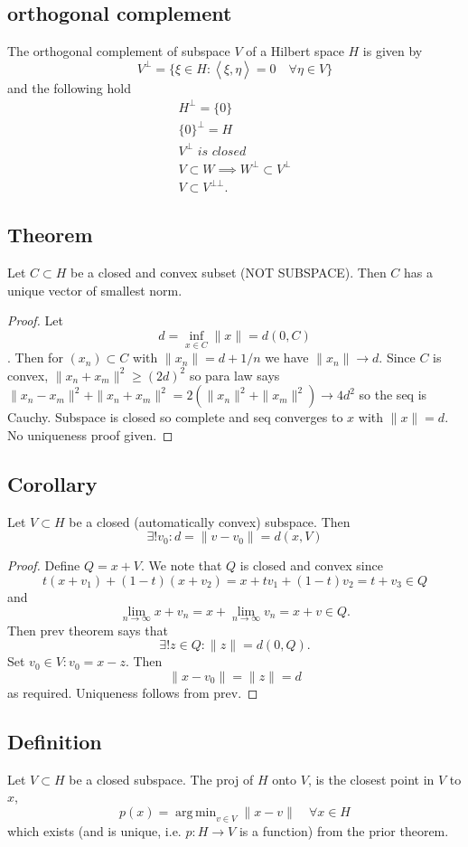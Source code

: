 \documentclass{article}
\DeclareMathOperator*{\argmin}{arg\,min}
\DeclareMathOperator\la{\langle}
\DeclareMathOperator\ra{\rangle}
\begin{document}
\subsection*{orthogonal complement}
The orthogonal complement of subspace $V$ of a Hilbert space $H$ is given by $$
V^{\bot} = \{ \xi \in H: \la \xi, \eta \ra = 0 \quad \forall \eta \in V \}
$$
and the following hold \begin{gather*}
H^{\bot} = \{ 0 \} \\
\{0\}^{\bot} = H \\
V^{\bot} \,\, is \,\, closed \\
V \subset W \implies W^{\bot} \subset V^{\bot} \\
V \subset V^{\bot \bot}.
\end{gather*}
\subsection*{Theorem}
Let $C \subset H$ be a closed and convex subset (NOT SUBSPACE). Then $C$ has a unique vector of smallest norm. \begin{proof}
Let $$d = \inf_{x \in C} \|x\| = d(0,C) $$. Then for $(x_n) \subset C$ with $\|x_n \| = d + 1 \slash n$ we have $\|x_n \| \to d$.
Since $C$ is convex, $\|x_n +x_m \|^2 \geq (2d)^2$ so para law says $\|x_n-x_m\|^2 + \|x_n+x_m\|^2 = 2(\|x_n\|^2 +\|x_m\|^2) \to 4d^2$ so the seq is Cauchy. Subspace is closed so complete and seq converges to $x$ with $\|x\| = d$. No uniqueness proof given.
\end{proof}
\subsection*{Corollary}
Let $V \subset H$ be a closed (automatically convex) subspace. Then $$
\exists ! v_0: d = \|v-v_0\| = d(x,V)
$$
\begin{proof}
Define $Q  = x+V$. We note that $Q$ is closed and convex since $$
t(x+v_1)+(1-t)(x+v_2) = x + tv_1+(1-t)v_2 = t+v_3 \in Q
$$
and $$
\lim_{n \to \infty} x+ v_n = x + \lim_{n \to \infty} v_n = x+v \in Q.
$$
Then prev theorem says that $$
\exists ! z \in Q: \|z\| = d(0,Q).
$$
Set $v_0 \in V: v_0 = x - z$. Then $$
\|x-v_0\| = \|z\| = d
$$
as required. Uniqueness follows from prev.
\end{proof}
\subsection*{Definition}
Let $V \subset H$ be a closed subspace. The proj of $H$ onto $V$, is
the closest point in $V$ to $x$, $$p(x) = \argmin_{v \in V} \|x-v\| \quad \forall x \in H$$
which exists (and is unique, i.e. $p:H \to V$ is a function) from the prior theorem.
\end{document}
